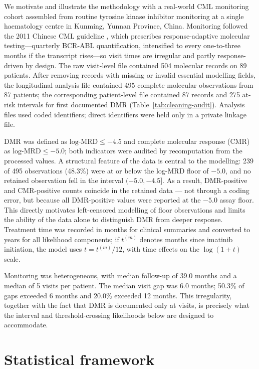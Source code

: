 \documentclass[11pt]{article}
\begin{document}
We motivate and illustrate the methodology with a real-world CML monitoring
cohort assembled from routine tyrosine kinase inhibitor monitoring at a single
haematology centre in Kunming, Yunnan Province, China. Monitoring followed the
2011 Chinese CML guideline \cite{CSH2011CMLGuideline}, which prescribes
response-adaptive molecular testing---quarterly BCR-ABL quantification,
intensified to every one-to-three months if the transcript rises---so visit
times are irregular and partly response-driven by design. The raw visit-level
file contained 504 molecular records on 89 patients. After removing records with missing or invalid
essential modelling fields, the longitudinal analysis file contained 495
complete molecular observations from 87 patients; the corresponding
patient-level file contained 87 records and 275 at-risk intervals for
first documented DMR (Table~\ref{tab:cleaning-audit}). Analysis files used coded
identifiers; direct identifiers were held only in a private linkage file.



DMR was defined as $\text{log-MRD}\le-4.5$ and complete molecular response
(CMR) as $\text{log-MRD}\le-5.0$; both indicators were audited by
recomputation from the processed values. A structural feature of the data
is central to the modelling: 239 of 495 observations (48.3\%) were at or
below the log-MRD floor of $-5.0$, and no retained observation fell in the
interval $(-5.0,-4.5]$. As a result, DMR-positive and CMR-positive counts
coincide in the retained data --- not through a coding error, but because
all DMR-positive values were reported at the $-5.0$ assay floor. This
directly motivates left-censored modelling of floor observations and
limits the ability of the data alone to distinguish DMR from deeper
response. Treatment time was recorded in months for clinical summaries and
converted to years for all likelihood components; if $t^{(m)}$ denotes
months since imatinib initiation, the model uses $t=t^{(m)}/12$, with
time effects on the $\log(1+t)$ scale.

Monitoring was heterogeneous, with median follow-up of 39.0 months and a
median of 5 visits per patient. The median visit gap was 6.0 months;
50.3\% of gaps exceeded 6 months and 20.0\% exceeded 12 months. This
irregularity, together with the fact that DMR is documented only at
visits, is precisely what the interval and threshold-crossing likelihoods
below are designed to accommodate.

\section{Statistical framework}
\label{sec:methods}
\end{document}
